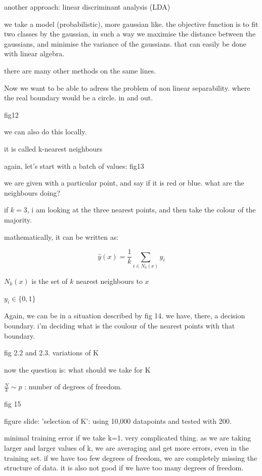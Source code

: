 \documentclass[a4paper]{tufte-book}
\begin{document}
another approach:
linear discriminant analysis (LDA)

we take a model (probabilistic), more gaussian like. the objective function is
to fit two classes by the gaussian, in such a way we maximise the distance
between the gaussians, and minimise the variance of the gaussians.
that can easily be done with linear algebra.

there are many other methods on the same lines.

Now we want to be able to adress the problem of non linear separability.
where the real boundary would be a circle.
in and out.

fig12

we can also do this locally.

it is called k-nearest neighbours

again, let's start with a batch of values:
fig13

we are given with a particular point, and say if it is red or blue.
what are the neighbours doing?

if $k=3$, i am looking at the three nearest points, and then take the colour of
the majority.

mathematically, it can be written as:

\begin{equation}
    \hat y(x)  = \frac{1}{k} \sum_{i\in N_k(x)} y_i
\end{equation}


$N_k(x)$ is the set of $k$ nearest neighbours to $x$

$y_i \in \{0,1\}$

Again, we can be in a situation described by fig 14.
we have, there, a decision boundary. i'm deciding what is the coulour of the
nearest points with that boundary.

fig 2.2 and 2.3. variations of K

now the question is: what should we take for K

$\frac{N}{k} \sim p$ : number of degrees of freedom.


fig 15

figure slide: 'selection of K': using 10,000 datapoints and tested with 200.

minimal training error if we take k=1. very complicated thing.
as we are taking larger and larger values of k, we are averaging and get more
errors, even in the training set.
if we have too few degrees of freedom, we are completely missing the structure
of data.
it is also not good if we have too many degrees of freedom.
\end{document}

